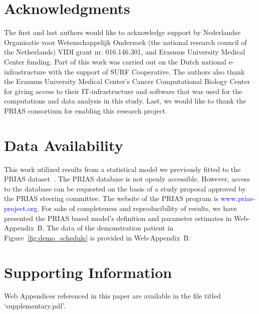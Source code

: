 \documentclass[useAMS, usenatbib, referee]{biom}
\begin{document}

\backmatter


\section*{Acknowledgments}
The first and last authors would like to acknowledge support by Nederlandse Organisatie voor Wetenschappelijk Onderzoek (the national research council of the Netherlands) VIDI grant nr. 016.146.301, and Erasmus University Medical Center funding. Part of this work was carried out on the Dutch national e-infrastructure with the support of SURF Cooperative. The authors also thank the Erasmus University Medical Center's Cancer Computational Biology Center for giving access to their IT-infrastructure and software that was used for the computations and data analysis in this study. Last, we would like to thank the PRIAS consortium for enabling this research project.

\section*{Data Availability}
This work utilized results from a statistical model we previously fitted to the PRIAS dataset~\citep{tomer2019personalized}. The PRIAS database is not openly accessible. However, access to the database can be requested on the basis of a study proposal approved by the PRIAS steering committee. The website of the PRIAS program is \textcolor{blue}{www.prias-project.org}. For sake of completeness and reproducibility of results, we have presented the PRIAS based model's definition and parameter estimates in Web-Appendix~B. The data of the demonstration patient in Figure~\ref{fig:demo_schedule} is provided in Web-Appendix~B.

\section*{Supporting Information}
Web Appendices referenced in this paper are available in the file titled `supplementary.pdf'.
\end{document}
